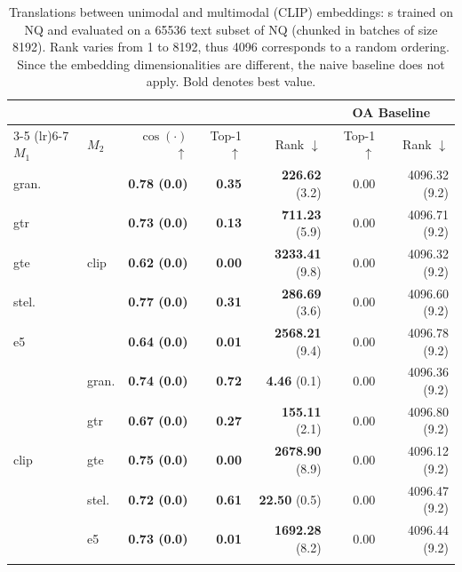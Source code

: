 \begin{table}[!b]
    \scriptsize
    \centering
    \begin{tabular}{llrrrrr}
        \toprule
        \multicolumn{2}{c}{} & \multicolumn{3}{c}{\atk{}} & \multicolumn{2}{c}{OA Baseline}\\
        \cmidrule(lr){3-5} \cmidrule(lr){6-7}
        $M_1$ & $M_2$ & $\cos(\cdot)$ $\uparrow$& Top-1 $\uparrow$& Rank $\downarrow$& Top-1 $\uparrow$& Rank $\downarrow$\\
        \midrule
        gran. & \multirow{5}{*}{clip} & \textbf{0.78 {\tiny (0.0)}} & \textbf{0.35} & \textbf{226.62} {\tiny (3.2)} & 0.00 & 4096.32 {\tiny (9.2)}\\
        gtr & & \textbf{0.73 {\tiny (0.0)}} & \textbf{0.13} & \textbf{711.23} {\tiny (5.9)} & 0.00 & 4096.71 {\tiny (9.2)} \\
        gte & & \textbf{0.62 {\tiny (0.0)}} & \textbf{0.00} & \textbf{3233.41} {\tiny (9.8)} & 0.00 & 4096.32 {\tiny (9.2)}\\
        stel. & & \textbf{0.77 {\tiny (0.0)}} & \textbf{0.31} & \textbf{286.69} {\tiny (3.6)} & 0.00 & 4096.60 {\tiny (9.2)} \\
        e5 & & \textbf{0.64 {\tiny (0.0)}} & \textbf{0.01} & \textbf{2568.21} {\tiny (9.4)} & 0.00 & 4096.78 {\tiny (9.2)}\\
        \midrule
        \multirow{5}{*}{clip} & gran. & \textbf{0.74 {\tiny (0.0)}} & \textbf{0.72} & \textbf{4.46} {\tiny (0.1)} & 0.00 & 4096.36 {\tiny (9.2)} \\
         & gtr & \textbf{0.67 {\tiny (0.0)}} & \textbf{0.27} & \textbf{155.11} {\tiny (2.1)} & 0.00 & 4096.80 {\tiny (9.2)} \\
         & gte & \textbf{0.75 {\tiny (0.0)}} & \textbf{0.00} & \textbf{2678.90} {\tiny (8.9)} & 0.00 & 4096.12 {\tiny (9.2)} \\
         & stel. & \textbf{0.72 {\tiny (0.0)}} & \textbf{0.61} & \textbf{22.50} {\tiny (0.5)} & 0.00 & 4096.47 {\tiny (9.2)} \\
         & e5 & \textbf{0.73 {\tiny (0.0)}} & \textbf{0.01} & \textbf{1692.28} {\tiny (8.2)} & 0.00 & 4096.44 {\tiny (9.2)} \\
        \bottomrule\\[-1.6ex]
    \end{tabular}
    \caption{Translations between unimodal and multimodal (CLIP) embeddings: \atk{}s trained on NQ and evaluated on a 65536 text subset of NQ (chunked in batches of size 8192). Rank varies from 1 to 8192, thus 4096 corresponds to a random ordering. Since the embedding dimensionalities are different, the naive baseline does not apply. Bold denotes best value.}
    \label{tab:CLIP_nq}
\end{table} 

